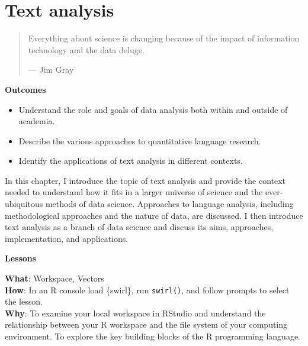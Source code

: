 \documentclass[
  letterpaper,
]{latex/krantz}
\providecommand{\tightlist}{%
  \setlength{\itemsep}{0pt}\setlength{\parskip}{0pt}}\usepackage{longtable,booktabs,array}
\theoremstyle{definition}
\theoremstyle{remark}
\begin{document}
\chapter{Text analysis}\label{sec-text-chapter}

\begin{quote}
Everything about science is changing because of the impact of
information technology and the data deluge.

--- Jim Gray
\end{quote}

\begin{tcolorbox}[enhanced jigsaw, bottomrule=.15mm, leftrule=.75mm, toprule=.15mm, breakable, colframe=quarto-callout-color-frame, arc=.35mm, left=2mm, rightrule=.15mm, opacityback=0, colback=white]

\textbf{ Outcomes}

\begin{itemize}
\tightlist
\item
  Understand the role and goals of data analysis both within and outside
  of academia.
\item
  Describe the various approaches to quantitative language research.
\item
  Identify the applications of text analysis in different contexts.
\end{itemize}

\end{tcolorbox}

In this chapter, I introduce the topic of text analysis and provide the
context needed to understand how it fits in a larger universe of science
and the ever-ubiquitous methods of data science. Approaches to language
analysis, including methodological approaches and the nature of data,
are discussed. I then introduce text analysis as a branch of data
science and discuss its aims, approaches, implementation, and
applications.

\begin{tcolorbox}[enhanced jigsaw, bottomrule=.15mm, leftrule=.75mm, toprule=.15mm, breakable, colframe=quarto-callout-color-frame, arc=.35mm, left=2mm, rightrule=.15mm, opacityback=0, colback=white]

\textbf{ Lessons}

\textbf{What}: Workspace, Vectors\\
\textbf{How}: In an R console load \{swirl\}, run \texttt{swirl()}, and
follow prompts to select the lesson.\\
\textbf{Why}: To examine your local workspace in RStudio and understand
the relationship between your R workspace and the file system of your
computing environment. To explore the key building blocks of the R
programming language.

\end{tcolorbox}
\end{document}
